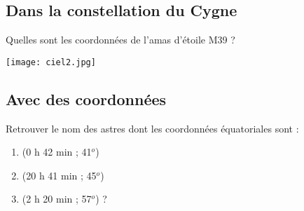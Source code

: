 \subsection*{Dans la constellation du Cygne}

Quelles sont les coordonnées de l'amas d'étoile M39 ?
\begin{center}
\texttt{[image: ciel2.jpg]} 
\end{center}

\subsection*{Avec des coordonnées}

Retrouver le nom des astres dont les coordonnées équatoriales sont :

\begin{enumerate}
\item (0 h 42 min ; 41$^o$) 
\item (20 h 41 min ; 45$^o$)
\item (2 h 20 min ; 57$^o$) ?
\end{enumerate}



